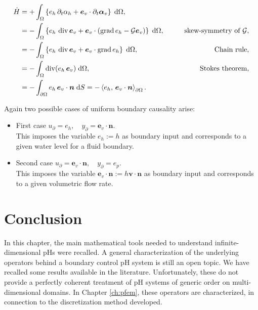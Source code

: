 \begin{equation}\label{eq:enrate_shwater}
\begin{aligned}
\dot{H} &= +\int_{\Omega} \left\{ e_h \, \partial_t \alpha_h + \bm{e}_v \cdot \partial_t \bm{\alpha}_v \right\} \d\Omega, \\
&= -\int_{\Omega} \left\{ e_h \, \div \bm{e}_v + \bm{e}_v \cdot (\grad e_h - \mathcal{G} \bm{e}_v) \right\} \d\Omega, \qquad &\text{skew-symmetry of }\mathcal{G}, \\
&= -\int_{\Omega} \left\{e_h \, \div \bm{e}_v + \bm{e}_v \cdot \grad e_h \right\}\d\Omega, \qquad &\text{Chain rule},  \\
&= -\int_{\Omega} \div(e_h \, \bm{e}_v) \d\Omega, \qquad &\text{Stokes theorem}, \\
&= -\int_{\partial \Omega} e_h \, \bm{e}_v\cdot\bm{n} \d{S} = -\inner[\partial\Omega]{e_h}{\bm{e}_v \cdot\bm{n}}.
\end{aligned}
\end{equation}

Again two possible cases of uniform boundary causality arise:
\begin{itemize}
	\item {First case} ${u}_\partial = e_h, \quad {y}_\partial = \bm{e}_v \cdot\bm{n}$. \\
	This imposes the variable $e_h:= h$ as boundary input and corresponds to a given water level for a fluid boundary.
	
	\item {Second case} ${u}_\partial = \bm{e}_v \cdot\bm{n}, \quad {y}_\partial = e_p$. \\
	This imposes the variable $\bm{e}_v \cdot\bm{n}:= h \bm{v} \cdot \bm{n}$ as boundary input and corresponds to a given volumetric flow rate.
\end{itemize} 

\section{Conclusion}
In this chapter, the main mathematical tools needed to understand infinite-dimensional pHs were recalled. A general characterization of the underlying operators behind a boundary control pH system is still an open topic. We have recalled some results available in the literature. Unfortunately, these do not provide a perfectly coherent treatment of pH systems of generic order on multi-dimensional domains. In Chapter \ref{ch:pfem}, these operators are characterized, in connection to the discretization method developed.